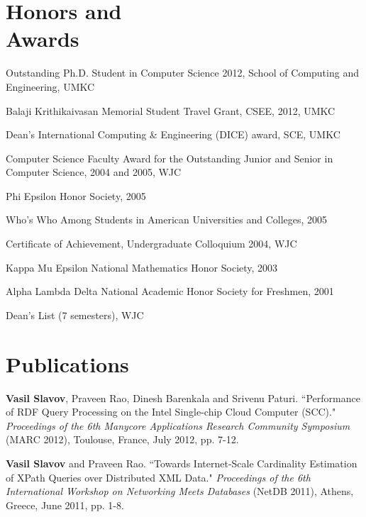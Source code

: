 \documentclass[margin,line]{resume}
\begin{document}
\begin{resume}
    \section{\mysidestyle Honors and\\Awards} 
    \begin{list2}
    \item Outstanding Ph.D. Student in Computer Science 2012, School of Computing and Engineering, UMKC
    \item Balaji Krithikaivasan Memorial Student Travel Grant, CSEE, 2012, UMKC
    \item Dean's International Computing \& Engineering (DICE) award, SCE, UMKC
    \item Computer Science Faculty Award for the Outstanding Junior and Senior in Computer Science, 2004 and 2005, WJC
    \item Phi Epsilon Honor Society, 2005
    \item Who's Who Among Students in American Universities and Colleges, 2005
    \item Certificate of Achievement, Undergraduate Colloquium 2004, WJC
    \item Kappa Mu Epsilon National Mathematics Honor Society, 2003
    \item Alpha Lambda Delta National Academic Honor Society for Freshmen, 2001
    \item Dean's List (7 semesters), WJC
    \end{list2}

    \section{\mysidestyle Publications}

    \textbf{Vasil Slavov}, Praveen Rao, Dinesh Barenkala and Srivenu Paturi.
    ``Performance of RDF Query Processing on the Intel Single-chip Cloud Computer (SCC)."
    \textsl{Proceedings of the 6th Manycore Applications Research Community Symposium} (MARC 2012), Toulouse, France, July 2012, pp. 7-12.
    
\vspace{-2mm}
    \textbf{Vasil Slavov} and Praveen Rao.
    ``Towards Internet-Scale Cardinality Estimation of XPath Queries over Distributed XML Data."
    \textsl{Proceedings of the 6th International Workshop on Networking Meets Databases} (NetDB 2011), Athens, Greece, June 2011, pp. 1-8.


\end{resume}
\end{document}
